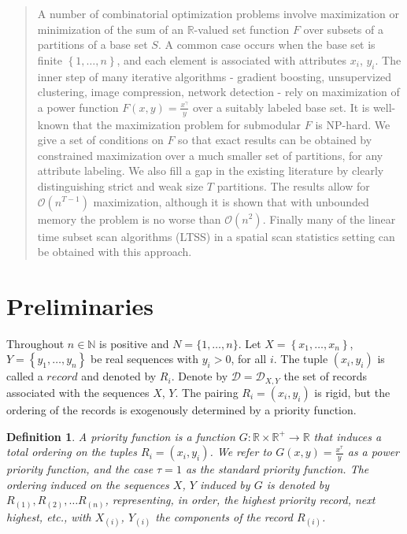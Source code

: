 \documentclass{article}
\newtheorem{definition}{Definition}
\theoremstyle{case}
\begin{document}
\sloppy

\begin{abstract}
	A number of combinatorial optimization problems involve maximization or minimization of the sum of an $\mathbb{R}$-valued set function $F$ over subsets of a partitions of a base set $S$. A common case occurs when the base set is finite $\left\lbrace 1, \dots, n\right\rbrace$, and each element is associated with attributes $x_i$, $y_i$. The inner step of many iterative algorithms - gradient boosting, unsupervized clustering, image compression, network detection - rely on maximization of a power function $F(x,y) = \frac{x^{\gamma}}{y}$ over a suitably labeled base set. It is well-known that the maximization problem for submodular $F$ is NP-hard. We give a set of conditions on $F$ so that exact results can be obtained by constrained maximization over a much smaller set of partitions, for any attribute labeling. We also fill a gap in the existing literature by clearly distinguishing strict and weak size $T$ partitions. The results allow for $\mathcal{O}\left( n^{T-1}\right)$ maximization, although it is shown that with unbounded memory the problem is no worse than $\mathcal{O}\left(n^2\right)$. Finally many of the linear time subset scan algorithms (LTSS) in a spatial scan statistics setting can be obtained with this approach.
\end{abstract}

\section{Preliminaries}
Throughout $n \in \mathbb{N}$ is positive and $N = \{1, \dots, n\}$. Let $X = \left\lbrace x_1, \dots, x_n\right\rbrace$, $Y = \left\lbrace y_1, \dots, y_n\right\rbrace$ be real sequences with $y_i > 0$, for all $i$. The tuple $\left(x_i, y_i\right)$ is called a $\textit{record}$ and denoted by $R_i$. Denote by $\mathcal{D} = \mathcal{D}_{X,Y}$ the set of records associated with the sequences $X$, $Y$. The pairing $R_i = \left(x_i, y_i\right)$ is rigid, but the ordering of the records is exogenously determined by a priority function. 

\begin{definition}
A priority function is a function $G\colon \mathbb{R} \times \mathbb{R}^{+} \to \mathbb{R}$ that induces a total ordering on the tuples $R_i = \left(x_i, y_i\right)$. We refer to $G(x,y) = \frac{x^{\tau}}{y}$ as a power priority function, and the case $\tau = 1$ as the standard priority function. The ordering induced on the sequences $X$, $Y$ induced by $G$ is denoted by $R_{(1)}, R_{(2)}, \dots R_{(n)}$, representing, in order, the highest priority record, next highest, etc., with $X_{\left( i\right)}$, $Y_{\left( i\right)}$ the components of the record $R_{\left( i\right)}$.
\end{definition}
\end{document}
